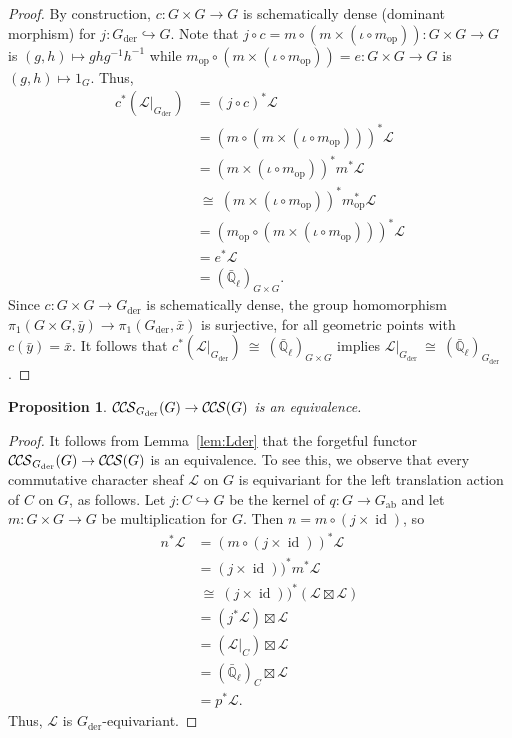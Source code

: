 \documentclass[10pt]{amsart}
\theoremstyle{plain}
\newtheorem{proposition}[theorem]{Proposition}
\theoremstyle{definition}
\newcommand{\EE}{\mathbb{\bar Q}_\ell}
\DeclareMathOperator{\id}{id}
\newcommand{\op}{_{\operatorname{op}}}
\newcommand{\der}{_{\operatorname{der}}}
\newcommand{\ab}{_{\operatorname{ab}}}
\newcommand{\iso}{{\ \cong\ }}
\newcommand{\cs}[1]{{\mathcal{#1}}}
\newcommand{\CCS}{{\mathcal{C\hskip-.8pt C\hskip-0.8pt S}}}
\begin{document}
\begin{proof}
By construction, $c : G \times G \to G$ is schematically dense (dominant morphism) for $j : G\der \hookrightarrow G$. 
Note that $j\circ c = m\circ (m \times (\iota\circ m\op)) : G \times G \to G$ is $(g,h) \mapsto gh g^{-1}h^{-1}$ while $m\op\circ (m \times (\iota\circ m\op))= e : G \times G \to G$ is $(g,h) \mapsto 1_G$. Thus,
\begin{align*}
c^* (\cs{L}\vert_{G\der})
&=  (j\circ c)^*\cs{L} \\
&= (m\circ (m \times (\iota\circ m\op)))^* \cs{L} \\
&= (m \times (\iota\circ m\op))^* m^* \cs{L} \\
&\iso (m \times (\iota\circ m\op))^* m\op^* \cs{L} \\
&= (m\op\circ (m \times (\iota\circ m\op)))^* \cs{L} \\
&= e^* \cs{L}\\
&= (\EE)_{G\times G}.
\end{align*}
Since $c : G \times G \to G\der$ is schematically dense, the group homomorphism $\pi_1(G\times G, {\bar y}) \to \pi_1(G\der, {\bar x})$ is surjective, for all geometric points with $c({\bar y}) = {\bar x}$. It follows that $c^* (\cs{L}\vert_{G\der}) \iso (\EE)_{G\times G}$ implies $\cs{L}\vert_{G\der} \iso (\EE)_{G\der}$. 
\end{proof}

\begin{proposition}\label{prop:Gder-equivariance}
$\CCS_{G\der}(G) \to \CCS(G)$ is an equivalence.
\end{proposition}

\begin{proof}
It follows from Lemma~\ref{lem:Lder} that the forgetful functor $\CCS_{G\der}(G) \to \CCS(G)$ is an equivalence. To see this, we observe that
every commutative character sheaf $\cs{L}$ on $G$ is equivariant for the left translation action of $C$ on $G$, as follows.
Let $j : C \hookrightarrow G$ be the kernel of $q : G \to G\ab$ and let $m : G\times G \to G$ be multiplication for $G$. 
Then $n = m \circ (j \times \id)$, so
\begin{align*}
n^* \cs{L} 
&= (m \circ (j \times \id))^* \cs{L}\\
&= (j \times \id))^* m^*\cs{L}\\
&\iso (j \times \id))^* (\cs{L} \boxtimes \cs{L})\\
&= (j^*\cs{L}) \boxtimes \cs{L}\\
&= (\cs{L}\vert_C) \boxtimes \cs{L}\\
&= (\EE)_C \boxtimes \cs{L}\\
&= p^* \cs{L}.
\end{align*}
Thus, $\cs{L}$ is $G\der$-equivariant.
\end{proof}
\end{document}
